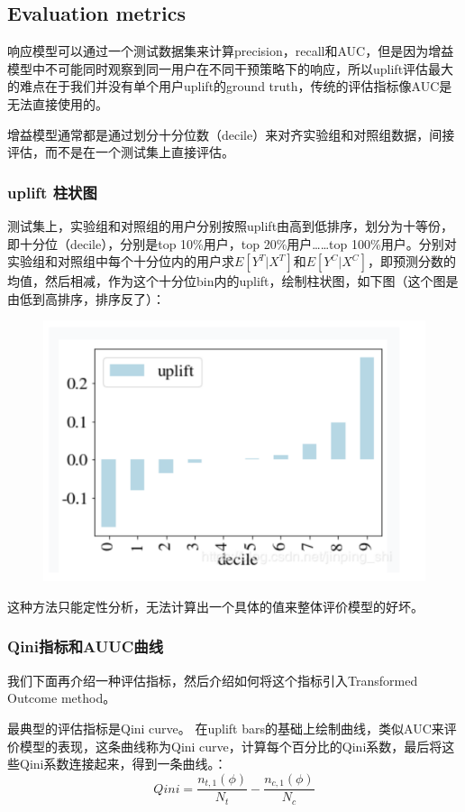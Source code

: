 \documentclass[12pt]{article}
\begin{document}
\subsection{Evaluation metrics}
响应模型可以通过一个测试数据集来计算precision，recall和AUC，但是因为增益模型中不可能同时观察到同一用户在不同干预策略下的响应，所以uplift评估最大的难点在于我们并没有单个用户uplift的ground truth，传统的评估指标像AUC是无法直接使用的。

增益模型通常都是通过划分十分位数（decile）来对齐实验组和对照组数据，间接评估，而不是在一个测试集上直接评估。

\subsubsection{uplift 柱状图}
测试集上，实验组和对照组的用户分别按照uplift由高到低排序，划分为十等份，即十分位（decile），分别是top 10\%用户，top 20\%用户……top 100\%用户。分别对实验组和对照组中每个十分位内的用户求$E[Y^T|X^T]$和$E[Y^C|X^C]$，即预测分数的均值，然后相减，作为这个十分位bin内的uplift，绘制柱状图，如下图（这个图是由低到高排序，排序反了）：
\begin{figure}[H]
    \centering
    \includegraphics[width=.6\textwidth]{fig/CasualInference-Uplift_Evaluate_Bar.png}
\end{figure}
这种方法只能定性分析，无法计算出一个具体的值来整体评价模型的好坏。

\subsubsection{Qini指标和AUUC曲线}
我们下面再介绍一种评估指标，然后介绍如何将这个指标引入Transformed Outcome method。

最典型的评估指标是Qini curve。 在uplift bars的基础上绘制曲线，类似AUC来评价模型的表现，这条曲线称为Qini curve，计算每个百分比的Qini系数，最后将这些Qini系数连接起来，得到一条曲线。：
$$
Qini = \frac{n_{t,1}(\phi)}{N_t} - \frac{n_{c,1}(\phi)}{N_c}
$$
\end{document}
